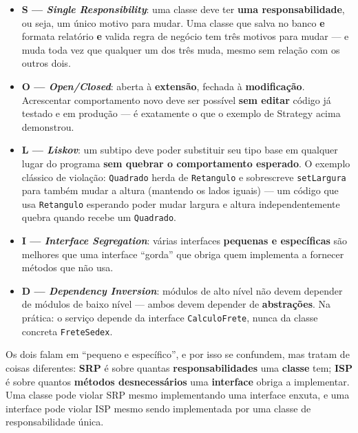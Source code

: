 \begin{conceito}
\begin{itemize}
\item \textbf{S --- \textit{Single Responsibility}}: uma classe deve ter
\textbf{uma responsabilidade}, ou seja, um único motivo para mudar. Uma
classe que salva no banco \textbf{e} formata relatório \textbf{e} valida
regra de negócio tem três motivos para mudar --- e muda toda vez que
qualquer um dos três muda, mesmo sem relação com os outros dois.
\item \textbf{O --- \textit{Open/Closed}}: aberta à \textbf{extensão},
fechada à \textbf{modificação}. Acrescentar comportamento novo deve ser
possível \textbf{sem editar} código já testado e em produção --- é
exatamente o que o exemplo de Strategy acima demonstrou.
\item \textbf{L --- \textit{Liskov}}: um subtipo deve poder substituir seu
tipo base em qualquer lugar do programa \textbf{sem quebrar o
comportamento esperado}. O exemplo clássico de violação: \texttt{Quadrado}
herda de \texttt{Retangulo} e sobrescreve \texttt{setLargura} para também
mudar a altura (mantendo os lados iguais) --- um código que usa
\texttt{Retangulo} esperando poder mudar largura e altura independentemente
quebra quando recebe um \texttt{Quadrado}.
\item \textbf{I --- \textit{Interface Segregation}}: várias interfaces
\textbf{pequenas e específicas} são melhores que uma interface “gorda” que
obriga quem implementa a fornecer métodos que não usa.
\item \textbf{D --- \textit{Dependency Inversion}}: módulos de alto nível
não devem depender de módulos de baixo nível --- ambos devem depender de
\textbf{abstrações}. Na prática: o serviço depende da interface
\texttt{CalculoFrete}, nunca da classe concreta \texttt{FreteSedex}.
\end{itemize}
\end{conceito}

\begin{cuidado}
Os dois falam em “pequeno e específico”, e por isso se confundem, mas
tratam de coisas diferentes: \textbf{SRP} é sobre quantas
\textbf{responsabilidades} uma \textbf{classe} tem; \textbf{ISP} é sobre
quantos \textbf{métodos desnecessários} uma \textbf{interface} obriga a
implementar. Uma classe pode violar SRP mesmo implementando uma interface
enxuta, e uma interface pode violar ISP mesmo sendo implementada por uma
classe de responsabilidade única.
\end{cuidado}

